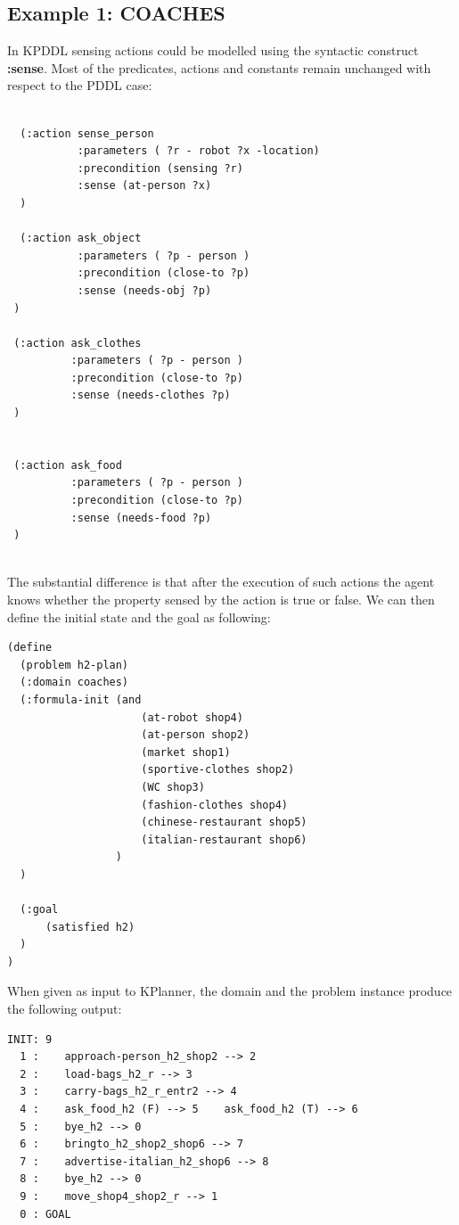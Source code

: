 \documentclass[pdftex,12pt,a4paper]{report}
\begin{document}
\subsection{Example 1: COACHES}
In KPDDL sensing actions could be modelled using the syntactic construct \textbf{:sense}. Most of the predicates, actions and constants remain unchanged with respect to the PDDL case:
\begin{verbatim}

  (:action sense_person
           :parameters ( ?r - robot ?x -location)
           :precondition (sensing ?r)
           :sense (at-person ?x)
  )

  (:action ask_object
           :parameters ( ?p - person )
           :precondition (close-to ?p)
           :sense (needs-obj ?p)
 )

 (:action ask_clothes
          :parameters ( ?p - person )
          :precondition (close-to ?p)
          :sense (needs-clothes ?p)
 )


 (:action ask_food
          :parameters ( ?p - person )
          :precondition (close-to ?p)
          :sense (needs-food ?p)
 )
\end{verbatim}\\
\noindent The substantial difference is that after the execution of such actions the agent knows whether the property sensed by the action is true or false. 
\noindent We can then define the initial state and the goal as following:
\begin{verbatim}
(define
  (problem h2-plan)
  (:domain coaches)
  (:formula-init (and
                     (at-robot shop4)
                     (at-person shop2)
                     (market shop1)
                     (sportive-clothes shop2)
                     (WC shop3)
                     (fashion-clothes shop4)
                     (chinese-restaurant shop5)
                     (italian-restaurant shop6)
                 )
  )

  (:goal
      (satisfied h2)
  )
)
\end{verbatim}
\noindent When given as input to KPlanner, the domain and the problem instance produce the following output:
\begin{verbatim}
INIT: 9
  1 :    approach-person_h2_shop2 --> 2 
  2 :    load-bags_h2_r --> 3 
  3 :    carry-bags_h2_r_entr2 --> 4 
  4 :    ask_food_h2 (F) --> 5    ask_food_h2 (T) --> 6 
  5 :    bye_h2 --> 0 
  6 :    bringto_h2_shop2_shop6 --> 7 
  7 :    advertise-italian_h2_shop6 --> 8 
  8 :    bye_h2 --> 0 
  9 :    move_shop4_shop2_r --> 1 
  0 : GOAL
\end{verbatim}\\
\end{document}
